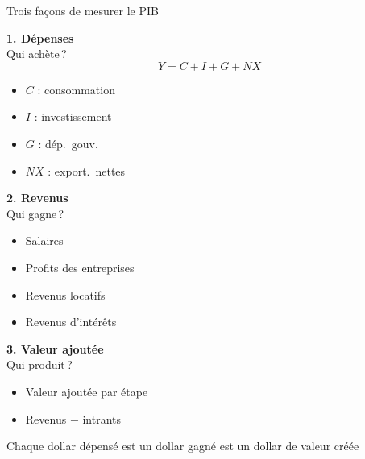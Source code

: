 \documentclass[aspectratio=169]{beamer}
\begin{document}
\begin{frame}[t]{Trois façons de mesurer le PIB}\examtag

   \small
   \noindent%
   \begin{minipage}[t]{0.33\textwidth}
      \textbf{\textcolor{HECnavy}{1. Dépenses}}\\[4pt]
      Qui achète\,?
      \vspace{-0.2cm}
      \begin{equation*}
         Y = C + I + G + NX
      \end{equation*}
      \vspace{-0.8cm}
      \begin{itemize}
         \footnotesize
         \item $C$ : consommation
         \item $I$ : investissement
         \item $G$ : dép.\ gouv.
         \item $NX$ : export.\ nettes
      \end{itemize}
   \end{minipage}%
   \begin{minipage}[t]{0.33\textwidth}
      \textbf{\textcolor{HECnavy}{2. Revenus}}\\[4pt]
      Qui gagne\,?
      \vspace{0.1cm}
      \begin{itemize}
         \footnotesize
         \item Salaires
         \item Profits des entreprises
         \item Revenus locatifs
         \item Revenus d'intérêts
      \end{itemize}
   \end{minipage}%
   \hspace{-0.5cm}
   \begin{minipage}[t]{0.33\textwidth}
      \textbf{\textcolor{HECnavy}{3. Valeur ajoutée}}\\[4pt]
      Qui produit\,?
      \vspace{0.1cm}
      \begin{itemize}
         \footnotesize
         \item Valeur ajoutée par étape
         \item Revenus $-$ intrants
      \end{itemize}
   \end{minipage}
   \vspace{0.2cm}
   \begin{keyinsight}
      Chaque dollar dépensé est un dollar gagné est un dollar de valeur créée
   \end{keyinsight}
\end{frame}
\end{document}
